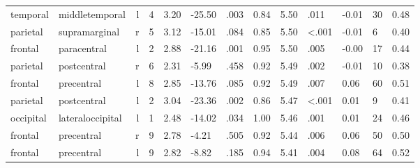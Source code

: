 \documentclass{article}
\begin{document}
\begin{longtable}{llrR{1.3cm}R{1cm}R{1.3cm}R{1cm}R{1cm}R{1.3cm}R{1cm}R{1.8cm}R{1.3cm}R{1.8cm}}
  temporal &            middletemporal &    l &         4 &                  3.20 &           -25.50 &               .003 &                               0.84 &                          5.50 &                            .011 &  -0.01 &     30 &      0.48 \\
  parietal &             supramarginal &    r &         5 &                  3.12 &           -15.01 &               .084 &                               0.85 &                          5.50 &                   \textless.001 &  -0.01 &      6 &      0.40 \\
   frontal &               paracentral &    l &         2 &                  2.88 &           -21.16 &               .001 &                               0.95 &                          5.50 &                            .005 &  -0.00 &     17 &      0.44 \\
  parietal &               postcentral &    r &         6 &                  2.31 &            -5.99 &               .458 &                               0.92 &                          5.49 &                            .002 &  -0.01 &     10 &      0.38 \\
   frontal &                precentral &    l &         8 &                  2.85 &           -13.76 &               .085 &                               0.92 &                          5.49 &                            .007 &   0.06 &     60 &      0.51 \\
  parietal &               postcentral &    l &         2 &                  3.04 &           -23.36 &               .002 &                               0.86 &                          5.47 &                   \textless.001 &   0.01 &      9 &      0.41 \\
 occipital &          lateraloccipital &    l &         1 &                  2.48 &           -14.02 &               .034 &                               1.00 &                          5.46 &                            .001 &   0.01 &     24 &      0.46 \\
   frontal &                precentral &    r &         9 &                  2.78 &            -4.21 &               .505 &                               0.92 &                          5.44 &                            .006 &   0.06 &     50 &      0.50 \\
   frontal &                precentral &    l &         9 &                  2.82 &            -8.82 &               .185 &                               0.94 &                          5.41 &                            .004 &   0.08 &     64 &      0.52 \\

\end{longtable}
\end{document}

